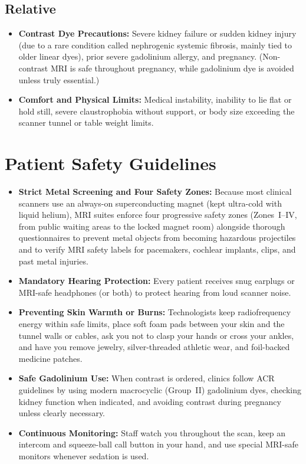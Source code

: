 \subsection{Relative}
\begin{itemize}
\item \textbf{Contrast Dye Precautions:} Severe kidney failure or sudden kidney injury (due to a rare condition called nephrogenic systemic fibrosis, mainly tied to older linear dyes), prior severe gadolinium allergy, and pregnancy. (Non-contrast MRI is safe throughout pregnancy, while gadolinium dye is avoided unless truly essential.)
\item \textbf{Comfort and Physical Limits:} Medical instability, inability to lie flat or hold still, severe claustrophobia without support, or body size exceeding the scanner tunnel or table weight limits.
\end{itemize}

\section{Patient Safety Guidelines}
\begin{itemize}
\item \textbf{Strict Metal Screening and Four Safety Zones:} Because most clinical scanners use an always-on superconducting magnet (kept ultra-cold with liquid helium), MRI suites enforce four progressive safety zones (Zones~I--IV, from public waiting areas to the locked magnet room) alongside thorough questionnaires to prevent metal objects from becoming hazardous projectiles and to verify MRI safety labels for pacemakers, cochlear implants, clips, and past metal injuries.
\item \textbf{Mandatory Hearing Protection:} Every patient receives snug earplugs or MRI-safe headphones (or both) to protect hearing from loud scanner noise.
\item \textbf{Preventing Skin Warmth or Burns:} Technologists keep radiofrequency energy within safe limits, place soft foam pads between your skin and the tunnel walls or cables, ask you not to clasp your hands or cross your ankles, and have you remove jewelry, silver-threaded athletic wear, and foil-backed medicine patches.
\item \textbf{Safe Gadolinium Use:} When contrast is ordered, clinics follow ACR guidelines by using modern macrocyclic (Group~II) gadolinium dyes, checking kidney function when indicated, and avoiding contrast during pregnancy unless clearly necessary.
\item \textbf{Continuous Monitoring:} Staff watch you throughout the scan, keep an intercom and squeeze-ball call button in your hand, and use special MRI-safe monitors whenever sedation is used.
\end{itemize}

